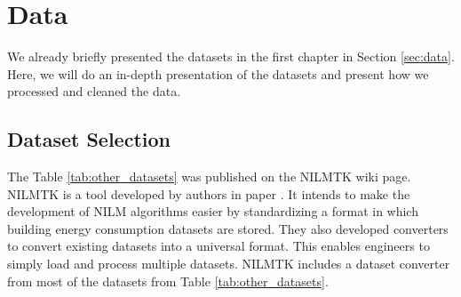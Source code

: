 \section{Data}
\label{ssec:data}
We already briefly presented the datasets in the first chapter in Section \ref{sec:data}.
Here, we will do an in-depth presentation of the datasets and present how we processed and cleaned the data. 

\subsection{Dataset Selection}

The Table \ref{tab:other_datasets} was published on the NILMTK \cite{nilmtk} wiki page. 
NILMTK is a tool developed by authors in paper \cite{nilmtk}.
It intends to make the development of NILM algorithms easier by standardizing a format in which building energy consumption datasets are stored. 
They also developed converters to convert existing datasets into a universal format.
This enables engineers to simply load and process multiple datasets.
NILMTK includes a dataset converter from most of the datasets from Table \ref{tab:other_datasets}.
